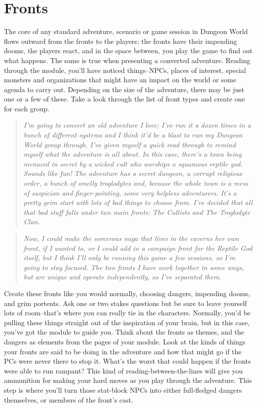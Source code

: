 \section*{Fronts}


The core of any standard adventure, scenario or game session in Dungeon World flows outward from the fronts to the players; the fronts have their impending dooms, the players react, and in the space between, you play the game to find out what happens. The same is true when presenting a converted adventure. Reading through the module, you'll have noticed things--NPCs, places of interest, special monsters and organizations that might have an impact on the world or some agenda to carry out. Depending on the size of the adventure, there may be just one or a few of these. Take a look through the list of front types and create one for each group.
\begin{quote}
\emph{I'm going to convert an old adventure I love; I've run it a dozen times in a bunch of different systems and I think it'd be a blast to run my Dungeon World group through. I've given myself a quick read through to remind myself what the adventure is all about. In this case, there's a town being menaced in secret by a wicked cult who worships a squamous reptile god. Sounds like fun! The adventure has a secret dungeon, a corrupt religious order, a bunch of smelly troglodytes and, because the whole town is a mess of suspicion and finger-pointing, some very helpless adventurers. It's a pretty grim start with lots of bad things to choose from. I've decided that all that bad stuff falls under two main fronts: The Cultists and The Troglodyte Clan.}
\end{quote}
\begin{quote}
\emph{Now, I could make the sorcerous naga that lives in the caverns her own front, if I wanted to, or I could add in a campaign front for the Reptile God itself, but I think I'll only be running this game a few sessions, so I'm going to stay focused. The two fronts I have work together in some ways, but are unique and operate independently, so I've separated them.}
\end{quote}

Create these fronts like you would normally, choosing dangers, impending dooms, and grim portents. Ask one or two stakes questions but be sure to leave yourself lots of room--that's where you can really tie in the characters. Normally, you'd be pulling these things straight out of the inspiration of your brain, but in this case, you've got the module to guide you. Think about the fronts as themes, and the dangers as elements from the pages of your module. Look at the kinds of things your fronts are said to be doing in the adventure and how that might go if the PCs were never there to stop it. What's the worst that could happen if the fronts were able to run rampant? This kind of reading-between-the-lines will give you ammunition for making your hard moves as you play through the adventure. This step is where you'll turn those stat-block NPCs into either full-fledged dangers themselves, or members of the front's cast.


